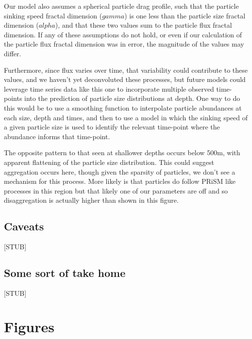 \documentclass[]{article}
\begin{document}
Our model also assumes a spherical particle drag profile, such that the
particle sinking speed fractal dimension (\(gamma\)) is one less than
the particle size fractal dimension (\(alpha\)), and that these two
values sum to the particle flux fractal dimension. If any of these
assumptions do not hold, or even if our calculation of the particle flux
fractal dimension was in error, the magnitude of the values may differ.

Furthermore, since flux varies over time, that variability could
contribute to these values, and we haven't yet deconvoluted these
processes, but future models could leverage time series data like this
one to incorporate multiple observed time-points into the prediction of
particle size distributions at depth. One way to do this would be to use
a smoothing function to interpolate particle abundances at each size,
depth and times, and then to use a model in which the sinking speed of a
given particle size is used to identify the relevant time-point where
the abundance informs that time-point.

The opposite pattern to that seen at shallower depths occurs below 500m,
with apparent flattening of the particle size distribution. This could
suggest aggregation occurs here, though given the sparsity of particles,
we don't see a mechanism for this process. More likely is that particles
do follow PRiSM like processes in this region but that likely one of our
parameters are off and so disaggregation is actually higher than shown
in this figure.

\hypertarget{caveats}{%
\subsection{Caveats}\label{caveats}}

{[}STUB{]}

\hypertarget{some-sort-of-take-home}{%
\subsection{Some sort of take home}\label{some-sort-of-take-home}}

{[}STUB{]}

\hypertarget{section}{%
\subsection{}\label{section}}

\hypertarget{figures}{%
\section{Figures}\label{figures}}
\end{document}
